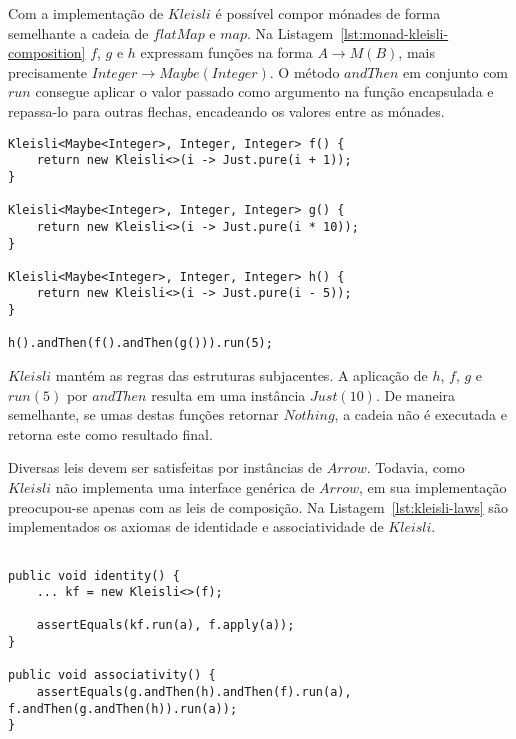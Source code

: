 \documentclass[10pt, conference]{IEEEtran}
\begin{document}
Com a implementação de $Kleisli$ é possível compor mónades de forma semelhante a cadeia de $flatMap$ e $map$. Na Listagem~\ref{lst:monad-kleisli-composition} $f$, $g$ e $h$ expressam funções na forma ${A \rightarrow M(B)}$, mais precisamente ${Integer \rightarrow Maybe(Integer)}$. O método $andThen$ em conjunto com $run$ consegue aplicar o valor passado como argumento na função encapsulada e repassa-lo para outras flechas, encadeando os valores entre as mónades.

\noindent\begin{minipage}[b]{\columnwidth}
\begin{lstlisting}[caption = {Composição monádica com $andThen$}, label = {lst:monad-kleisli-composition}]
Kleisli<Maybe<Integer>, Integer, Integer> f() {
	return new Kleisli<>(i -> Just.pure(i + 1));
}

Kleisli<Maybe<Integer>, Integer, Integer> g() {
	return new Kleisli<>(i -> Just.pure(i * 10));
}

Kleisli<Maybe<Integer>, Integer, Integer> h() {
	return new Kleisli<>(i -> Just.pure(i - 5));
}

h().andThen(f().andThen(g())).run(5);

\end{lstlisting}
\end{minipage}

$Kleisli$ mantém as regras das estruturas subjacentes. A aplicação de $h$, $f$, $g$ e $run(5)$ por $andThen$ resulta em uma instância $Just(10)$. De maneira semelhante, se umas destas funções retornar  $Nothing$, a cadeia não é executada e retorna este como resultado final.

Diversas leis devem ser satisfeitas por instâncias de $Arrow$. Todavia, como $Kleisli$ não implementa uma interface genérica de $Arrow$, em sua implementação preocupou-se apenas com as leis de composição. Na Listagem~\ref{lst:kleisli-laws} são implementados os axiomas de identidade e associatividade de $Kleisli$.

\begin{lstlisting}[caption = {Leis de $Kleisli$}, label = {lst:kleisli-laws}]

public void identity() {
	... kf = new Kleisli<>(f);
	
	assertEquals(kf.run(a), f.apply(a));
}

public void associativity() {
	assertEquals(g.andThen(h).andThen(f).run(a), 							 f.andThen(g.andThen(h)).run(a));
}
\end{lstlisting}
\end{document}
